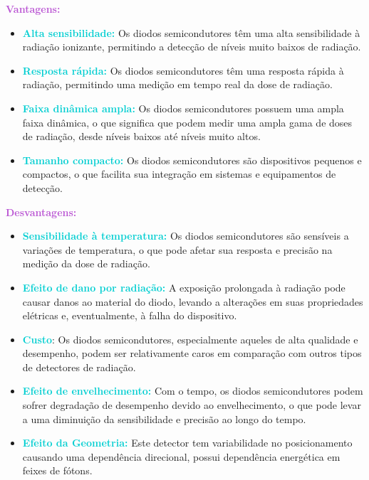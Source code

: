 \documentclass[11pt,a4paper]{article}
\begin{document}
	\begin{tcolorbox}[width=\textwidth, colback={white}, colbacktitle={DarkTurquoise!50!white}, title={$\bigstar$ \LobsterTwo{Diodos} $\bigstar$}, coltitle={CarnationPink}, colframe={DarkTurquoise}, fonttitle=\rmfamily\bfseries\Large, breakable]
		\textcolor{MediumOrchid}{\Large\LobsterTwo\textbf{Vantagens:}}
		\begin{itemize}[label=\textcolor{CarnationPink}{$\blacktriangleright$}]
			\item \textcolor{DarkTurquoise}{\textbf{Alta sensibilidade:}} Os diodos semicondutores têm uma alta sensibilidade à radiação ionizante, permitindo a detecção de níveis muito baixos de radiação.
			\item \textcolor{DarkTurquoise}{\textbf{Resposta rápida:}} Os diodos semicondutores têm uma resposta rápida à radiação, permitindo uma medição em tempo real da dose de radiação.
			\item \textcolor{DarkTurquoise}{\textbf{Faixa dinâmica ampla:}} Os diodos semicondutores possuem uma ampla faixa dinâmica, o que significa que podem medir uma ampla gama de doses de radiação, desde níveis baixos até níveis muito altos.
			\item \textcolor{DarkTurquoise}{\textbf{Tamanho compacto:}} Os diodos semicondutores são dispositivos pequenos e compactos, o que facilita sua integração em sistemas e equipamentos de detecção.
		\end{itemize}

			
		\textcolor{MediumOrchid}{\Large\LobsterTwo\textbf{Desvantagens:}}
		\begin{itemize}[label=\textcolor{CarnationPink}{$\blacktriangleright$}]
			\item \textcolor{DarkTurquoise}{\textbf{Sensibilidade à temperatura:}} Os diodos semicondutores são sensíveis a variações de temperatura, o que pode afetar sua resposta e precisão na medição da dose de radiação.
			\item \textcolor{DarkTurquoise}{\textbf{Efeito de dano por radiação:}} A exposição prolongada à radiação pode causar danos ao material do diodo, levando a alterações em suas propriedades elétricas e, eventualmente, à falha do dispositivo.
			\item \textcolor{DarkTurquoise}{\textbf{Custo}}: Os diodos semicondutores, especialmente aqueles de alta qualidade e desempenho, podem ser relativamente caros em comparação com outros tipos de detectores de radiação.
			\item \textcolor{DarkTurquoise}{\textbf{Efeito de envelhecimento:}} Com o tempo, os diodos semicondutores podem sofrer degradação de desempenho devido ao envelhecimento, o que pode levar a uma diminuição da sensibilidade e precisão ao longo do tempo.
			\item \textcolor{DarkTurquoise}{\textbf{Efeito da Geometria:}} Este detector tem variabilidade no posicionamento causando uma dependência direcional, possui dependência energética em feixes de fótons.
		\end{itemize}
	\end{tcolorbox}
\end{document}

